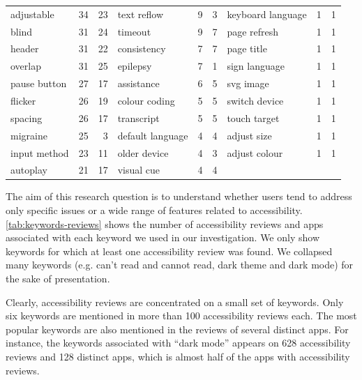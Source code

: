 \begin{table}[!htb]
\begin{tabular}{lrr||lrr||lrr}
adjustable       & 34      & 23   & text reflow      & 9       & 3    & keyboard language  & 1       & 1    \\
blind            & 31      & 24   & timeout          & 9       & 7    & page refresh       & 1       & 1    \\
header           & 31      & 22   & consistency      & 7       & 7    & page title         & 1       & 1    \\
overlap          & 31      & 25   & epilepsy         & 7       & 1    & sign language      & 1       & 1    \\
pause button     & 27      & 17   & assistance       & 6       & 5    & svg image          & 1       & 1    \\
flicker          & 26      & 19   & colour coding    & 5       & 5    & switch device      & 1       & 1    \\
spacing          & 26      & 17   & transcript       & 5       & 5    & touch target       & 1       & 1    \\
migraine         & 25      & 3    & default language & 4       & 4    & adjust size        & 1       & 1    \\
input method     & 23      & 11   & older device     & 4       & 3    & adjust colour      & 1       & 1    \\
autoplay         & 21      & 17   & visual cue       & 4       & 4    &                    &         &     \\
\hline
\end{tabular}
\end{table}


The aim of this research question is to understand whether users tend to address only specific issues or a wide range of features related to accessibility. \autoref{tab:keywords-reviews} shows the number of accessibility reviews and apps associated with each keyword we used in our investigation. We only show keywords for which at least one accessibility review was found. We collapsed many keywords (e.g. can't read and cannot read, dark theme and dark mode) for the sake of presentation. 


Clearly, accessibility reviews are concentrated on a small set of keywords. Only six keywords are mentioned in more than 100 accessibility reviews each. The most popular keywords are also mentioned in the reviews of several distinct apps. For instance, the keywords associated with ``dark mode'' appears on 628 accessibility reviews and 128 distinct apps, which is almost half of the apps with accessibility reviews. 


